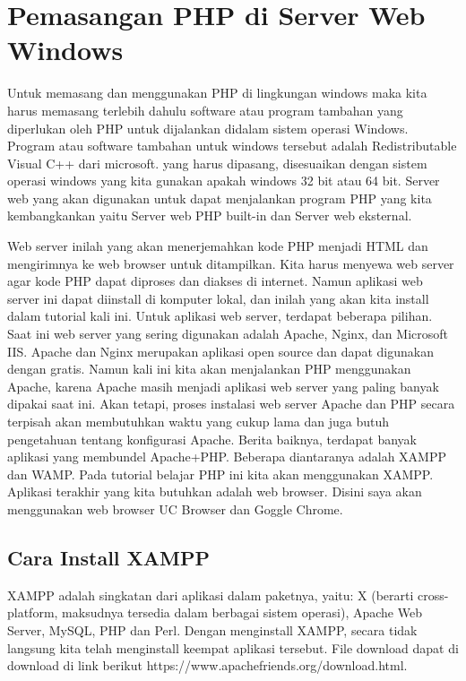 \section{Pemasangan PHP di Server Web Windows}
Untuk memasang dan menggunakan PHP di lingkungan windows maka kita harus memasang terlebih dahulu software atau program tambahan yang diperlukan oleh PHP untuk dijalankan didalam sistem operasi Windows. Program atau software tambahan untuk windows tersebut adalah Redistributable Visual C++ dari microsoft. yang harus dipasang, disesuaikan dengan sistem operasi windows yang kita gunakan apakah windows 32 bit atau 64 bit. Server web yang akan digunakan untuk dapat menjalankan program PHP yang kita kembangkankan yaitu Server web PHP built-in dan Server web eksternal. 
\par
Web server inilah yang akan menerjemahkan kode PHP menjadi HTML dan mengirimnya ke web browser untuk ditampilkan. Kita harus menyewa web server agar kode PHP dapat diproses dan diakses di internet. Namun aplikasi web server ini dapat diinstall di komputer lokal, dan inilah yang akan kita install dalam tutorial kali ini. Untuk aplikasi web server, terdapat beberapa pilihan. Saat ini web server yang sering digunakan adalah Apache, Nginx, dan Microsoft IIS. Apache dan Nginx merupakan aplikasi open source dan dapat digunakan dengan gratis. Namun kali ini kita akan menjalankan PHP menggunakan Apache, karena Apache masih menjadi aplikasi web server yang paling banyak dipakai saat ini. Akan tetapi, proses instalasi web server Apache dan PHP secara terpisah akan membutuhkan waktu yang cukup lama dan juga butuh pengetahuan tentang konfigurasi Apache. Berita baiknya, terdapat banyak aplikasi yang membundel Apache+PHP. Beberapa diantaranya adalah XAMPP dan WAMP. Pada tutorial belajar PHP ini kita akan menggunakan XAMPP. Aplikasi terakhir yang kita butuhkan adalah web browser. Disini saya akan menggunakan web browser UC Browser dan Goggle Chrome.

\subsection{Cara Install XAMPP}
XAMPP adalah singkatan dari aplikasi dalam paketnya, yaitu: X (berarti cross-platform, maksudnya tersedia dalam berbagai sistem operasi), Apache Web Server, MySQL, PHP dan Perl. Dengan menginstall XAMPP, secara tidak langsung kita telah menginstall keempat aplikasi tersebut. File download dapat di download di link berikut https://www.apachefriends.org/download.html.